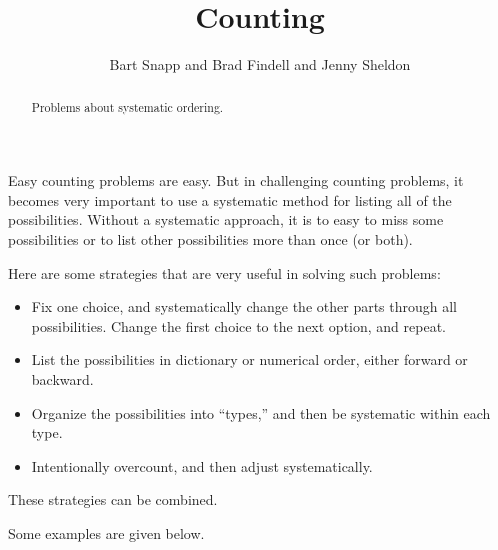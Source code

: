 \documentclass[nooutcomes]{ximera}
\title{Counting}
\author{Bart Snapp and Brad Findell and Jenny Sheldon}
\begin{document}
\begin{abstract}
Problems about systematic ordering.
\end{abstract}
\maketitle


Easy counting problems are easy.  But in challenging counting problems, it becomes very important to use a systematic method for listing all of the possibilities.  Without a systematic approach, it is to easy to miss some possibilities or to    
list other possibilities more than once (or both). 

Here are some strategies that are very useful in solving such problems:  
\begin{itemize}
\item Fix one choice, and systematically change the other parts through all possibilities.  Change the first choice to the next option, and repeat.  
\item List the possibilities in dictionary or numerical order, either forward or backward. 
\item Organize the possibilities into ``types,'' and then be systematic within each type.  
\item Intentionally overcount, and then adjust systematically.  
\end{itemize}
These strategies can be combined.  

Some examples are given below. 
\end{document}

